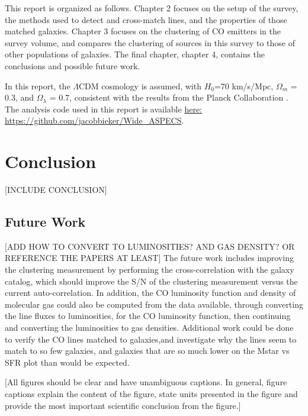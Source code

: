 \documentclass[twoside,single]{lion-msc}
\begin{document}
This report is organized as follows. Chapter 2 focuses on the setup of the survey, the methods used to detect and cross-match lines, and the properties of those matched galaxies. Chapter 3 focuses on the clustering of CO emitters in the survey volume, and compares the clustering of sources in this survey to those of other populations of galaxies. The final chapter, chapter 4, contains the conclusions and possible future work. 

In this report, the $\Lambda$CDM cosmology is assumed, with $H_0$=70 km/s/Mpc, $\Omega_m$ = 0.3, and $\Omega_{\lambda}$ = 0.7, consistent with the results from the Planck Collaboration \cite{ade2016planck}. The analysis code used in this report is available \href{https://github.com/jacobbieker/Wide\_ASPECS}{here: https://github.com/jacobbieker/Wide\_ASPECS}. 





\chapter{Conclusion}

[INCLUDE CONCLUSION]

\section{Future Work}

[ADD HOW TO CONVERT TO LUMINOSITIES? AND GAS DENSITY? OR REFERENCE THE PAPERS AT LEAST]
The future work includes improving the clustering measurement by performing the cross-correlation with the galaxy catalog, which should improve the S/N of the clustering measurement versus the current auto-correlation. In addition, the CO luminosity function and density of molecular gas could also be computed from the data available, through converting the line fluxes to luminosities, for the CO luminosity function, then continuing and converting the luminosities to gas densities. Additional work could be done to verify the CO lines matched to galaxies,and investigate why the lines seem to match to so few galaxies, and galaxies that are so much lower on the Mstar vs SFR plot than would be expected. 

[All figures should be clear and have unambiguous captions. In general, figure captions explain the content of the figure, state units presented in the figure and provide the most important scientific conclusion from the figure.]

\appendix



\end{document}
